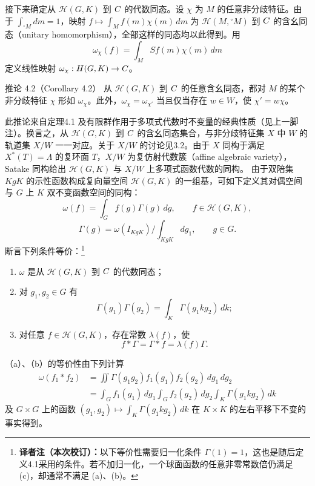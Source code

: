 接下来确定从 $\mathcal H(G,K)$ 到 $C$ 的代数同态。设 $\chi$ 为 $M$ 的任意非分歧特征。由于 $\int_{{}^\circ M}dm=1$，映射 $f\mapsto\int_Mf(m)\chi(m)\,dm$ 为 $\mathcal H(M,{}^\circ M)$ 到 $C$ 的含幺同态（unitary homomorphism），全部这样的同态均以此得到。用
\[
\omega_\chi(f)=\int_MSf(m)\chi(m)\,dm\tag{28}
\]
定义线性映射 $\omega_\chi:H(G,K)\to C$。
\begin{originaltheorem}{推论 4.2（Corollary 4.2）}
从 $\mathcal H(G,K)$ 到 $C$ 的任意含幺同态，都对 $M$ 的某个非分歧特征 $\chi$ 形如 $\omega_\chi$。此外，$\omega_\chi=\omega_{\chi'}$ 当且仅当存在 $w\in W$，使 $\chi'=w\chi$。
\end{originaltheorem}
此推论来自定理4.1 及有限群作用于多项式代数时不变量的经典性质（见上一脚注）。换言之，从 $\mathcal H(G,K)$ 到 $C$ 的含幺同态集合，与非分歧特征集 $X$ 中 $W$ 的轨道集 $X/W$ 一一对应。关于 $X/W$ 的讨论见3.2。由于 $X$ 同构于满足 $X^*(T)=\Lambda$ 的复环面 $T$，$X/W$ 为复仿射代数簇（affine algebraic variety），Satake 同构给出 $\mathcal H(G,K)$ 与 $X/W$ 上多项式函数代数的同构。
由于双陪集 $KgK$ 的示性函数构成复向量空间 $\mathcal H(G,K)$ 的一组基，可如下定义其对偶空间与 $G$ 上 $K$ 双不变函数空间的同构：
\[
\omega(f)=\int_G f(g)\Gamma(g)\,dg,\qquad f\in\mathcal H(G,K),\tag{29}
\]
\[
\Gamma(g)=\omega(I_{KgK})\big/\int_{KgK}dg_1,\qquad g\in G.\tag{30}
\]
断言下列条件等价：\footnote{\textbf{译者注（本次校订）：}以下等价性需要归一化条件 $\Gamma(1)=1$，这也是随后定义4.1采用的条件。若不加归一化，一个球面函数的任意非零常数倍仍满足 (c)，却通常不满足 (a)、(b)。}
\begin{enumerate}
\item[(a)] $\omega$ 是从 $\mathcal H(G,K)$ 到 $C$ 的代数同态；
\item[(b)] 对 $g_1,g_2\in G$ 有
\[
\Gamma(g_1)\Gamma(g_2)=\int_K\Gamma(g_1kg_2)\,dk;\tag{31}
\]
\item[(c)] 对任意 $f\in\mathcal H(G,K)$，存在常数 $\lambda(f)$，使
\[
f*\Gamma=\Gamma*f=\lambda(f)\Gamma.\tag{32}
\]
\end{enumerate}
（a）、（b）的等价性由下列计算
\[
\begin{aligned}
\omega(f_1*f_2)&=\iint\Gamma(g_1g_2)f_1(g_1)f_2(g_2)\,dg_1\,dg_2\\
&=\int_G f_1(g_1)\,dg_1\int_Gf_2(g_2)\,dg_2\int_K\Gamma(g_1kg_2)\,dk
\end{aligned}
\]
及 $G\times G$ 上的函数 $(g_1,g_2)\mapsto\int_K\Gamma(g_1kg_2)\,dk$ 在 $K\times K$ 的左右平移下不变的事实得到。

